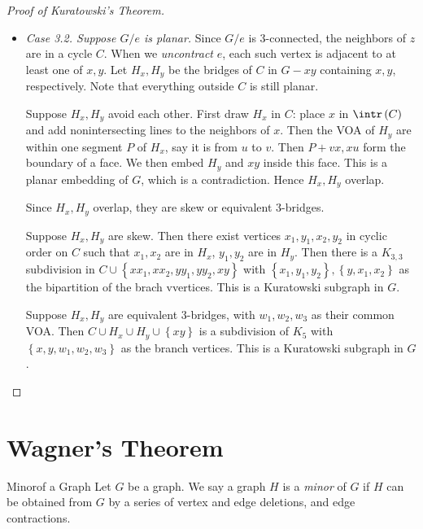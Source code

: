 \documentclass[co342]{subfiles}
\begin{document}
\begin{proof}[Proof of Kuratowski's Theorem]
\begin{itemize}
\begin{itemize}
                    \item \textit{Case 3.2. Suppose $G /e$ is planar.} Since $G /e$ is $3$-connected, the neighbors of $z$ are in a cycle $C$. When we \textit{uncontract} $e$, each such vertex is adjacent to at least one of $x,y$. Let $H_x, H_y$  be the bridges of $C$ in $G-xy$ containing $x,y$, respectively. Note that everything outside $C$ is still planar.

                        Suppose $H_x,H_y$ avoid each other. First draw $H_x$ in $C$: place $x$ in $\intr\left( C \right)$ and add nonintersecting lines to the neighbors of $x$. Then the VOA of $H_y$ are within one segment $P$ of $H_x$, say it is from $u$ to $v$. Then $P+vx,xu$ form the boundary of a face. We then embed $H_y$ and $xy$ inside this face. This is a planar embedding of $G$, which is a contradiction. Hence $H_x, H_y$ overlap.

                        Since $H_x,H_y$ overlap, they are skew or equivalent $3$-bridges.

                        Suppose $H_x, H_y$ are skew. Then there exist vertices $x_1,y_1,x_2,y_2$ in cyclic order on $C$ such that $x_1,x_2$ are in $H_x$, $y_1,y_2$ are in $H_y$. Then there is a $K_{3,3}$ subdivision in $C\cup\left\lbrace xx_1,xx_2,yy_1,yy_2,xy \right\rbrace$ with $\left\lbrace x_1,y_1,y_2 \right\rbrace , \left\lbrace y,x_1,x_2 \right\rbrace$ as the bipartition of the brach vvertices. This is a Kuratowski subgraph in $G$.

                        Suppose $H_x, H_y$ are equivalent $3$-bridges, with $w_1,w_2,w_3$ as their common VOA. Then $C\cup H_x\cup H_y\cup \left\lbrace xy \right\rbrace$ is a subdivision of $K_5$ with $\left\lbrace x,y,w_1,w_2,w_3 \right\rbrace$ as the branch vertices. This is a Kuratowski subgraph in $G$. \qqedsym
                \end{itemize} 
        \end{itemize} 
    \end{proof}
    
    \section{Wagner's Theorem}
    
    \begin{definition}{Minor}{of a Graph}
        Let $G$ be a graph. We say a graph $H$ is a \emph{minor} of $G$ if $H$ can be obtained from $G$ by a series of vertex and edge deletions, and edge contractions.
    \end{definition}
\end{document}
